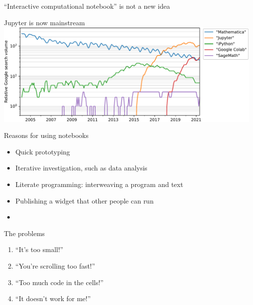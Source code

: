 \documentclass[aspectratio=169]{beamer}
\begin{document}
\begin{frame}{``Interactive computational notebook'' is not a new idea}
\begin{columns}
{cm}
Now it's starting to look like Tioga\ldots}\only<13>{a bit\ldots}
\end{columns}
\end{frame}

\begin{frame}{Jupyter is now mainstream}
\vspace{0.5 cm}
\includegraphics[width=\linewidth]{img/trends-jupyter-ipython.pdf}
\end{frame}

\begin{frame}{Reasons for using notebooks}
\vspace{0.5 cm}
\Large
\begin{itemize}\setlength{\itemsep}{0.5 cm}
\item Quick prototyping
\item Iterative investigation, such as data analysis
\item Literate programming: interweaving a program and text
\item Publishing a widget that other people can run
\item {}
\end{itemize}

\hfill {}

\vspace{-0.2 cm}
\hfill {}
\end{frame}

\begin{frame}{The problems}
\vspace{0.5 cm}
\LARGE
\begin{center}
\begin{minipage}{0.6\linewidth}
\begin{enumerate}\setlength{\itemsep}{0.75 cm}
\item ``It's too small!''
\item ``You're scrolling too fast!''
\item ``Too much code in the cells!''
\item ``It doesn't work for me!''
\end{enumerate}
\end{minipage}
\end{center}
\end{frame}
\end{document}

